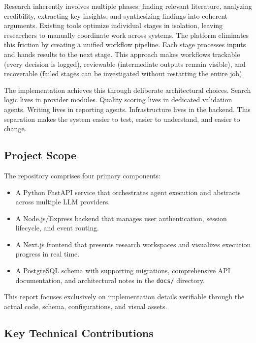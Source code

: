 \documentclass[12pt, a4paper]{article}
\begin{document}
Research inherently involves multiple phases: finding relevant literature, analyzing credibility,
extracting key insights, and synthesizing findings into coherent arguments. Existing tools
optimize individual stages in isolation, leaving researchers to manually coordinate work
across systems. The platform eliminates this friction by creating a unified workflow pipeline.
Each stage processes inputs and hands results to the next stage. This approach makes workflows
trackable (every decision is logged), reviewable (intermediate outputs remain visible), and
recoverable (failed stages can be investigated without restarting the entire job).

The implementation achieves this through deliberate architectural choices. Search logic lives
in provider modules. Quality scoring lives in dedicated validation agents. Writing lives in
reporting agents. Infrastructure lives in the backend. This separation makes the system
easier to test, easier to understand, and easier to change.

\subsection{Project Scope}

The repository comprises four primary components:

\begin{itemize}
  \item A Python FastAPI service that orchestrates agent execution and abstracts across
        multiple LLM providers.
  \item A Node.js/Express backend that manages user authentication, session lifecycle, and
        event routing.
  \item A Next.js frontend that presents research workspaces and visualizes execution progress
        in real time.
  \item A PostgreSQL schema with supporting migrations, comprehensive API documentation,
        and architectural notes in the \texttt{docs/} directory.
\end{itemize}

This report focuses exclusively on implementation details verifiable through the actual code,
schema, configurations, and visual assets.

\subsection{Key Technical Contributions}
\end{document}

